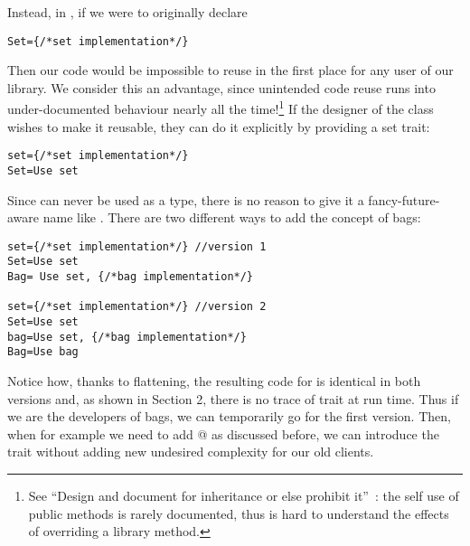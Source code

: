 Instead, in \name, if we were to originally declare
\begin{lstlisting}
Set={/*set implementation*/} 
\end{lstlisting}
Then our code would be impossible to reuse in the first place for any user of our library.
We consider this an advantage, since unintended code reuse runs into under-documented behaviour nearly all the time!\footnote{See
``Design and document for inheritance or else prohibit
it''~\cite{Bloch08}: the
self use of public methods is rarely documented, thus is hard to understand the effects of overriding a library method.
}
If the designer of the \Q@Set@ class wishes to make it reusable, they can do it explicitly by providing a set trait{:}%
\begin{lstlisting}
set={/*set implementation*/} 
Set=Use set
\end{lstlisting}
Since \Q@set@ can never be used as a type, there is no reason to give it a fancy-future-aware name like
\Q@AbstractSetOrBag@.
There are two different ways to add the concept of bags:
\begin{lstlisting}
set={/*set implementation*/} //version 1
Set=Use set
Bag= Use set, {/*bag implementation*/}

set={/*set implementation*/} //version 2
Set=Use set
bag=Use set, {/*bag implementation*/}
Bag=Use bag
\end{lstlisting}
Notice how, thanks to flattening, the resulting code for \Q@Bag@ is identical in both versions
and, as shown in Section 2, there is no trace of trait \Q@bag@ at run time. 
Thus if we are the developers of bags, we can temporarily go for the first version.
Then, when for example we need to add @ as discussed before,
we can introduce the \Q@bag@ trait without adding new undesired complexity for our old clients.

